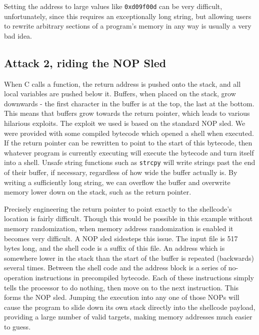 Setting the address to large values like {\tt 0xd09f00d} can be very difficult, unfortunately, since this requires an
exceptionally long string, but allowing users to rewrite arbitrary sections of a program's memory in any way is usually
a very bad idea.


\subsection{Attack 2, riding the NOP Sled}

When C calls a function, the return address is pushed onto the stack, and all local variables are pushed below it.
Buffers, when placed on the stack, grow downwards - the first character in the buffer is at the top, the last at the
bottom. This means that buffers grow towards the return pointer, which leads to various hilarious exploits. The exploit
we used is based on the standard NOP sled. We were provided with some compiled bytecode which opened a shell when
executed. If the return pointer can be rewritten to point to the start of this bytecode, then whatever program is
currently executing will execute the bytecode and turn itself into a shell. Unsafe string functions such as {\tt strcpy}
will write strings past the end of their buffer, if necessary, regardless of how wide the buffer actually is. By writing
a sufficiently long string, we can overflow the buffer and overwrite memory lower down on the stack, such as the return
pointer.

Precisely engineering the return pointer to point exactly to the shellcode's location is fairly difficult. Though this
would be possible in this example without memory randomization, when memory address randomization is enabled it becomes
very difficult. A NOP sled sidesteps this issue. The input file is 517 bytes long, and the shell code is a suffix of
this file. An address which is somewhere lower in the stack than the start of the buffer is repeated (backwards) several
times. Between the shell code and the address block is a series of no-operation instructions in precompiled bytecode.
Each of these instructions simply tells the processor to do nothing, then move on to the next instruction. This forms
the NOP sled. Jumping the execution into any one of those NOPs will cause the program to slide down its own stack
directly into the shellcode payload, providing a large number of valid targets, making memory addresses much easier to
guess.

